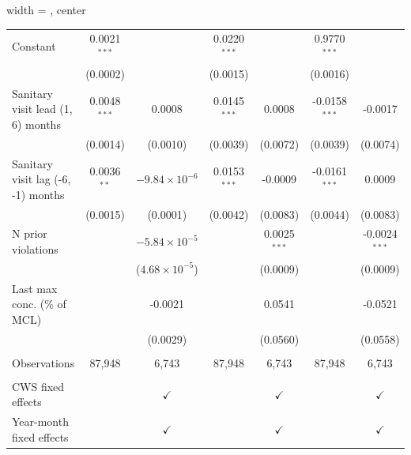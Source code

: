 \begin{table}[htbp]
\begin{adjustbox}{width = \textwidth, center}
\begin{tabular}{lcccccc}
         \midrule 
         Constant                           & 0.0021$^{***}$ &                         & 0.0220$^{***}$ &                & 0.9770$^{***}$  &   \\   
                                            & (0.0002)       &                         & (0.0015)       &                & (0.0016)        &   \\   
         Sanitary visit lead (1, 6) months  & 0.0048$^{***}$ & 0.0008                  & 0.0145$^{***}$ & 0.0008         & -0.0158$^{***}$ & -0.0017\\   
                                            & (0.0014)       & (0.0010)                & (0.0039)       & (0.0072)       & (0.0039)        & (0.0074)\\   
         Sanitary visit lag (-6, -1) months & 0.0036$^{**}$  & $-9.84\times 10^{-6}$   & 0.0153$^{***}$ & -0.0009        & -0.0161$^{***}$ & 0.0009\\   
                                            & (0.0015)       & (0.0001)                & (0.0042)       & (0.0083)       & (0.0044)        & (0.0083)\\   
         N prior violations                 &                & $-5.84\times 10^{-5}$   &                & 0.0025$^{***}$ &                 & -0.0024$^{***}$\\   
                                            &                & ($4.68\times 10^{-5}$)  &                & (0.0009)       &                 & (0.0009)\\   
         Last max conc. (\% of MCL)         &                & -0.0021                 &                & 0.0541         &                 & -0.0521\\   
                                            &                & (0.0029)                &                & (0.0560)       &                 & (0.0558)\\   
         
          \\
         
         Observations                       & 87,948         & 6,743                   & 87,948         & 6,743          & 87,948          & 6,743\\  
         
          \\
         
         CWS fixed effects                  &                & $\checkmark$            &                & $\checkmark$   &                 & $\checkmark$\\   
         Year-month fixed effects           &                & $\checkmark$            &                & $\checkmark$   &                 & $\checkmark$\\   
         

\end{tabular}
\end{adjustbox}
\end{table}
